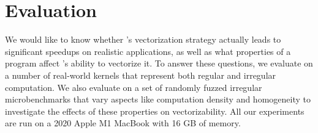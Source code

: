 \section{Evaluation}\label{sec:eval}


We would like to know whether \system's vectorization strategy actually leads to significant speedups on realistic applications, as well as what properties of a program affect \system's ability to vectorize it.
To answer these questions, we evaluate \system on a number of real-world kernels that represent both regular and irregular computation.
We also evaluate \system on a set of randomly fuzzed irregular microbenchmarks that vary aspects like computation density and homogeneity to investigate the effects of these properties on vectorizability. %
All our experiments are run on a 2020 Apple M1 MacBook with 16 GB of memory. %

